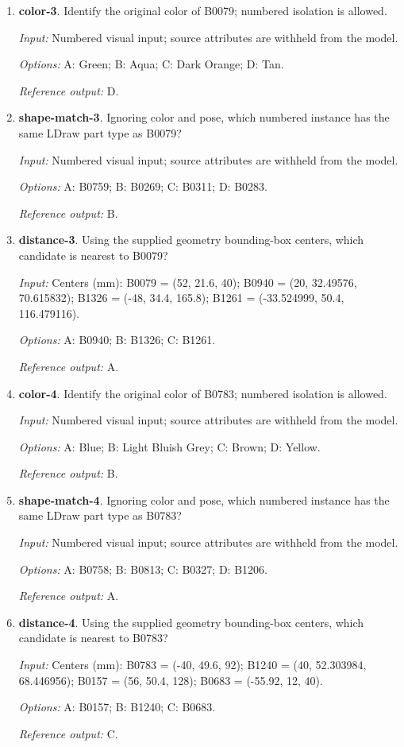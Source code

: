 \begin{enumerate}
\item \textbf{color-3}. Identify the original color of B0079; numbered isolation is allowed.\par {\small \textit{Input:} Numbered visual input; source attributes are withheld from the model. \par\textit{Options:} A: Green; B: Aqua; C: Dark Orange; D: Tan. \par\textit{Reference output:} D.}
\item \textbf{shape-match-3}. Ignoring color and pose, which numbered instance has the same LDraw part type as B0079?\par {\small \textit{Input:} Numbered visual input; source attributes are withheld from the model. \par\textit{Options:} A: B0759; B: B0269; C: B0311; D: B0283. \par\textit{Reference output:} B.}
\item \textbf{distance-3}. Using the supplied geometry bounding-box centers, which candidate is nearest to B0079?\par {\small \textit{Input:} Centers (mm): B0079 = (52, 21.6, 40); B0940 = (20, 32.49576, 70.615832); B1326 = (-48, 34.4, 165.8); B1261 = (-33.524999, 50.4, 116.479116). \par\textit{Options:} A: B0940; B: B1326; C: B1261. \par\textit{Reference output:} A.}
\item \textbf{color-4}. Identify the original color of B0783; numbered isolation is allowed.\par {\small \textit{Input:} Numbered visual input; source attributes are withheld from the model. \par\textit{Options:} A: Blue; B: Light Bluish Grey; C: Brown; D: Yellow. \par\textit{Reference output:} B.}
\item \textbf{shape-match-4}. Ignoring color and pose, which numbered instance has the same LDraw part type as B0783?\par {\small \textit{Input:} Numbered visual input; source attributes are withheld from the model. \par\textit{Options:} A: B0758; B: B0813; C: B0327; D: B1206. \par\textit{Reference output:} A.}
\item \textbf{distance-4}. Using the supplied geometry bounding-box centers, which candidate is nearest to B0783?\par {\small \textit{Input:} Centers (mm): B0783 = (-40, 49.6, 92); B1240 = (40, 52.303984, 68.446956); B0157 = (56, 50.4, 128); B0683 = (-55.92, 12, 40). \par\textit{Options:} A: B0157; B: B1240; C: B0683. \par\textit{Reference output:} C.}

\end{enumerate}
